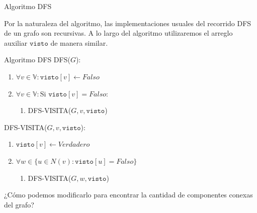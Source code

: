 \documentclass[10pt,hyperref={colorlinks = true,linkcolor = blue}, aspectratio=169]{beamer}
\newcommand \anchoPagina{1.0} %
\begin{document}
\begin{frame}{Algoritmo DFS}
    \begin{minipage}{\anchoPagina \textwidth}
        Por la naturaleza del algoritmo, las implementaciones usuales del recorrido DFS de un grafo son recursivas.
        A lo largo del algoritmo utilizaremos el arreglo auxiliar $\texttt{visto}$ de manera similar.
    \end{minipage}
\end{frame}

\begin{frame}{Algoritmo DFS}
    DFS($G$):
    \begin{enumerate}
        \item $\forall v \in \mathbb{V}: \texttt{visto}[v] \leftarrow Falso$
        \item $\forall v \in \mathbb{V}: \text{Si } \texttt{visto}[v] = Falso:$
        \begin{enumerate}
            \item DFS-VISITA($G,v, \texttt{visto}$)
        \end{enumerate}
    \end{enumerate}
    \pause

    DFS-VISITA($G,v, \texttt{visto}$):
    \begin{enumerate}
        \item $\texttt{visto}[v] \leftarrow Verdadero$
        \item $\forall w \in \{u \in N(v) : \texttt{visto}[u] = Falso \}$
        \begin{enumerate}
            \item DFS-VISITA($G,w, \texttt{visto}$)
        \end{enumerate}
    \end{enumerate}
    \pause

    ¿Cómo podemos modificarlo para encontrar la cantidad de componentes conexas del grafo?
\end{frame}
\end{document}
